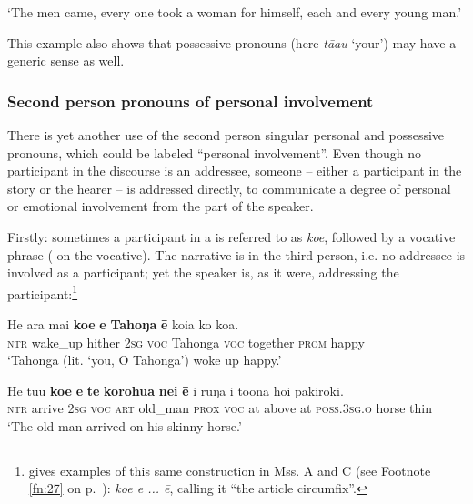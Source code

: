 \glt
‘The men came, every one took a woman for himself, each and every young man.’ \textstyleExampleref{[Mtx-3-01.285]}
\z

This example also shows that possessive pronouns (here \textit{tā{\ꞌ}au} ‘your’) may have a generic sense as well. 

\subsubsection[Second person pronouns of personal involvement]{Second person pronouns of personal involvement}\label{sec:4.2.4.2}

There is yet another use of the second person singular personal and possessive pronouns, which could be labeled “personal involvement”. Even though no participant in the discourse is an addressee, someone – either a participant in the story or the hearer – is addressed directly, to communicate a degree of personal or emotional involvement from the part of the speaker.

Firstly: sometimes a participant in a  is referred to as \textit{koe}, followed by a vocative phrase ( on the vocative). The narrative is in the third person, i.e. no addressee is involved as a participant; yet the speaker is, as it were, addressing the participant:\footnote{\label{fn:165}\citet[400]{Fedorova1965} gives examples of this same construction in Mss. A and C (see Footnote \ref{fn:27} on p.~\pageref{fn:27}): \textit{koe e ... ē}, calling it “the article circumfix”.}

\ea\label{ex:4.6}
\gll He {\ꞌ}ara mai \textbf{koe} \textbf{e} \textbf{Tahoŋa} \textbf{ē} koia ko koa. \\
\textsc{ntr} wake\_up hither \textsc{2sg} \textsc{voc} Tahonga \textsc{voc} together \textsc{prom} happy \\

\glt 
‘Tahonga (lit. ‘you, O Tahonga’) woke up happy.’ \textstyleExampleref{[R301.351]} 
\z

\ea\label{ex:4.7}
\gll He tu{\ꞌ}u \textbf{koe} \textbf{e} \textbf{te} \textbf{korohu{\ꞌ}a} \textbf{nei} \textbf{ē} {\ꞌ}i ruŋa i tō{\ꞌ}ona hoi pakiroki. \\
\textsc{ntr} arrive \textsc{2sg} \textsc{voc} \textsc{art} old\_man \textsc{prox} \textsc{voc} at above at \textsc{poss.3sg.o} horse thin \\

\glt
‘The old man arrived on his skinny horse.’ \textstyleExampleref{[R363.017]} 
\z

